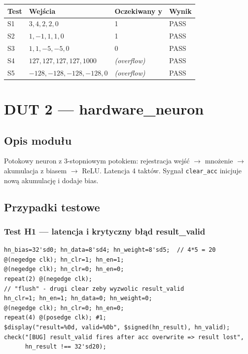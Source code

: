 \documentclass[12pt,a4paper]{article}
\begin{document}
\begin{center}
\begin{tabular}{llll}
\toprule
\textbf{Test} & \textbf{Wejścia} & \textbf{Oczekiwany y} & \textbf{Wynik} \\
\midrule
S1 & $3,4,2,2,0$ & 1 & PASS \\
S2 & $1,-1,1,1,0$ & 1 & PASS \\
S3 & $1,1,-5,-5,0$ & 0 & PASS \\
S4 & $127,127,127,127,1000$ & \textit{(overflow)} & PASS \\
S5 & $-128,-128,-128,-128,0$ & \textit{(overflow)} & PASS \\
\bottomrule
\end{tabular}
\end{center}

\section{DUT 2 — hardware\_neuron}

\subsection{Opis modułu}

Potokowy neuron z 3-stopniowym potokiem: rejestracja wejść $\to$ mnożenie $\to$ akumulacja z biasem $\to$ ReLU. Latencja 4 taktów. Sygnał \texttt{clear\_acc} inicjuje nową akumulację i dodaje bias.

\subsection{Przypadki testowe}

\subsubsection*{Test H1 — latencja i krytyczny błąd result\_valid}

\begin{lstlisting}
hn_bias=32'sd0; hn_data=8'sd4; hn_weight=8'sd5;  // 4*5 = 20
@(negedge clk); hn_clr=1; hn_en=1;
@(negedge clk); hn_clr=0; hn_en=0;
repeat(2) @(negedge clk);
// "flush" - drugi clear zeby wyzwolic result_valid
hn_clr=1; hn_en=1; hn_data=0; hn_weight=0;
@(negedge clk); hn_clr=0; hn_en=0;
repeat(4) @(posedge clk); #1;
$display("result=%0d, valid=%0b", $signed(hn_result), hn_valid);
check("[BUG] result_valid fires after acc overwrite => result lost",
      hn_result !== 32'sd20);
\end{lstlisting}
\end{document}

